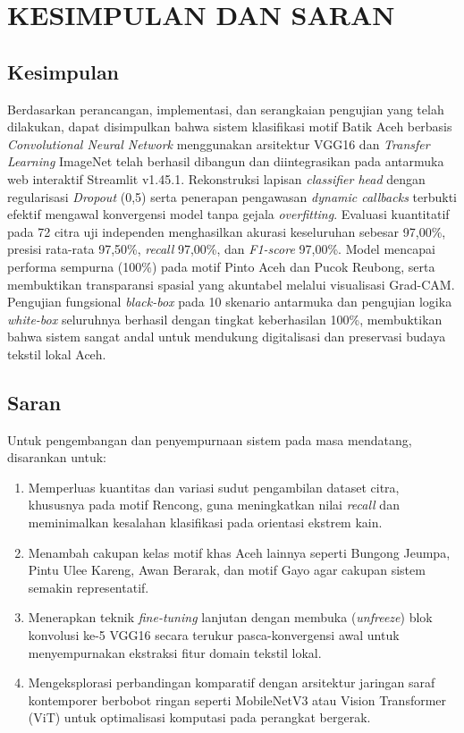 \documentclass[10pt,a4paper]{article}
\begin{document}
\FloatBarrier
\section{KESIMPULAN DAN SARAN}

\subsection{Kesimpulan}
Berdasarkan perancangan, implementasi, dan serangkaian pengujian yang telah dilakukan, dapat disimpulkan bahwa sistem klasifikasi motif Batik Aceh berbasis \textit{Convolutional Neural Network} menggunakan arsitektur VGG16 dan \textit{Transfer Learning} ImageNet telah berhasil dibangun dan diintegrasikan pada antarmuka web interaktif Streamlit v1.45.1. Rekonstruksi lapisan \textit{classifier head} dengan regularisasi \textit{Dropout} (0,5) serta penerapan pengawasan \textit{dynamic callbacks} terbukti efektif mengawal konvergensi model tanpa gejala \textit{overfitting}. Evaluasi kuantitatif pada 72 citra uji independen menghasilkan akurasi keseluruhan sebesar 97,00\%, presisi rata-rata 97,50\%, \textit{recall} 97,00\%, dan \textit{F1-score} 97,00\%. Model mencapai performa sempurna (100\%) pada motif Pinto Aceh dan Pucok Reubong, serta membuktikan transparansi spasial yang akuntabel melalui visualisasi Grad-CAM. Pengujian fungsional \textit{black-box} pada 10 skenario antarmuka dan pengujian logika \textit{white-box} seluruhnya berhasil dengan tingkat keberhasilan 100\%, membuktikan bahwa sistem sangat andal untuk mendukung digitalisasi dan preservasi budaya tekstil lokal Aceh.

\subsection{Saran}
Untuk pengembangan dan penyempurnaan sistem pada masa mendatang, disarankan untuk:
\begin{enumerate}
  \item Memperluas kuantitas dan variasi sudut pengambilan dataset citra, khususnya pada motif Rencong, guna meningkatkan nilai \textit{recall} dan meminimalkan kesalahan klasifikasi pada orientasi ekstrem kain.
  \item Menambah cakupan kelas motif khas Aceh lainnya seperti Bungong Jeumpa, Pintu Ulee Kareng, Awan Berarak, dan motif Gayo agar cakupan sistem semakin representatif.
  \item Menerapkan teknik \textit{fine-tuning} lanjutan dengan membuka (\textit{unfreeze}) blok konvolusi ke-5 VGG16 secara terukur pasca-konvergensi awal untuk menyempurnakan ekstraksi fitur domain tekstil lokal.
  \item Mengeksplorasi perbandingan komparatif dengan arsitektur jaringan saraf kontemporer berbobot ringan seperti MobileNetV3 atau Vision Transformer (ViT) untuk optimalisasi komputasi pada perangkat bergerak.
\end{enumerate}
\end{document}
